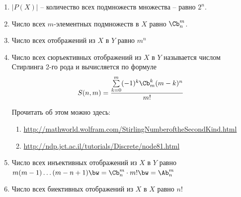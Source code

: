 \begin{enumerate}
  \item $|P(X)|$ -- количество всех подмножеств множества -- равно $2^n$.
  \item Число всех $m$-элементных подмножеств в $X$ равно $\Cb^m_n$.
  \item Число всех отображений из $X$ в $Y$ равно $m^n$
  \item Число всех сюръективных отображений из $X$ в $Y$ называется числом Стирлинга 2-го рода и вычисляется по формуле
  $$S(n,m) = \frac{\sum\limits_{k=0}^m (-1)^k \Cb_m^k (m-k)^n}{m!}$$

    Прочитать об этом можно здесь:
    \begin{enumerate}
      \item \href{http://mathworld.wolfram.com/StirlingNumberoftheSecondKind.html}{http://mathworld.wolfram.com/StirlingNumberoftheSecondKind.html}
      \item \href{http://ndp.jct.ac.il/tutorials/Discrete/node81.html}{http://ndp.jct.ac.il/tutorials/Discrete/node81.html}
    \end{enumerate}
  \item Число всех инъективных отображений из $X$ в $Y$ равно $m(m-1)\dots(m-n+1)\bw=\Cb^m_n\cdot m!\bw=\Ab^m_n$
  \item Число всех биективных отображений из $X$ в $X$ равно $n!$
\end{enumerate}
